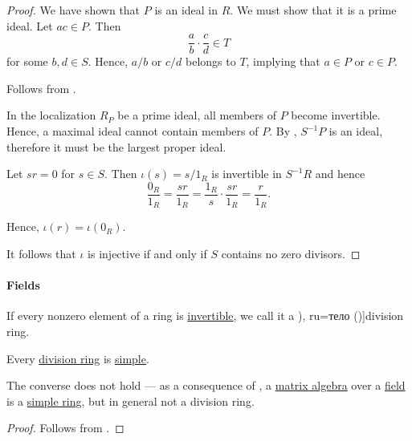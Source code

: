 \begin{proof}
  We have shown that \( P \) is an ideal in \( R \). We must show that it is a prime ideal. Let \( ac \in P \). Then
  \begin{equation*}
    \frac a b \cdot \frac c d \in T
  \end{equation*}
  for some \( b, d \in S \). Hence, \( a / b \) or \( c / d \) belongs to \( T \), implying that \( a \in P \) or \( c \in P \).

   Follows from .

   In the localization \( R_P \) be a prime ideal, all members of \( P \) become invertible. Hence, a maximal ideal cannot contain members of \( P \). By , \( S^{-1} P \) is an ideal, therefore it must be the largest proper ideal.

   Let \( sr = 0 \) for \( s \in S \). Then \( \iota(s) = s / 1_R \) is invertible in \( S^{-1} R \) and hence
  \begin{equation*}
    \frac {0_R} {1_R}
    =
    \frac {sr} {1_R}
    =
    \frac {1_R} s \cdot \frac {sr} {1_R}
    =
    \frac r {1_R}.
  \end{equation*}

  Hence, \( \iota(r) = \iota(0_R) \).

  It follows that \( \iota \) is injective if and only if \( S \) contains no zero divisors.
\end{proof}

\paragraph{Fields}

\begin{definition}\label{def:division_ring}
  If every nonzero element of a ring is \hyperref[def:divisibility/invertible]{invertible}, we call it a \term[bg=тяло (\cite[def. XI.1]{ГеновМиховскиМоллов1991}), ru=тело (\cite[def. XI.6.6]{Винберг2014})]{division ring}.
\end{definition}

\begin{proposition}\label{thm:division_ring_is_simple}
  Every \hyperref[def:division_ring]{division ring} is \hyperref[def:simple_object]{simple}.
\end{proposition}
\begin{comments}
  \item The converse does not hold --- as a consequence of , a \hyperref[thm:matrix_algebra]{matrix algebra} over a \hyperref[def:field]{field} is a \hyperref[def:simple_object]{simple ring}, but in general not a division ring.
\end{comments}
\begin{proof}
  Follows from .
\end{proof}

